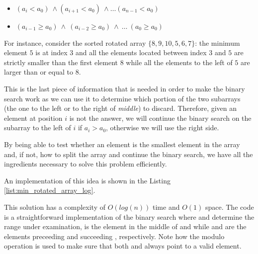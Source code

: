 \begin{itemize}
	\item $	(a_i < a_0) \: \wedge (a_{i+1} < a_0) \: \wedge \ldots (a_{n-1} < a_0) $
	\item $	(a_{i-1} \geq a_0) \: \wedge \: (a_{i-2} \geq a_0) \: \wedge \: \ldots \: (a_{0} \geq a_0) $
\end{itemize}
For instance, consider the sorted rotated array $\{8,9,10,5,6,7\}$: the minimum element $5$ is at index $3$ and all the elements located between index $3$ and $5$ are strictly smaller than the first element $8$ while all the elements to the left of $5$ are larger than or equal to $8$.

This is the last piece of information that is needed in order to make the binary search work as we can use it to determine which portion of the two subarrays (the one to the left or to the right of \textit{middle}) to discard. Therefore, given an element at position $i$ is not the answer, we will continue the binary search on the subarray to the left of $i$ if $a_i > a_0$, otherwise we will use the right side.

By being able to test whether an element is the smallest element in the array and,  if not, how to split the array and continue the binary search, we have all the ingredients necessary to solve this problem efficiently.

An implementation of this idea is shown in the Listing \ref{list:min_rotated_array_log}.



This solution has a complexity of $O(log(n))$ time and $O(1)$ space.
The code is a straightforward implementation of the binary search where  and  determine the range under examination,  is the element in the middle of  and  while  and  are the elements preceeding and succeeding , respectively. Note how the modulo operation is used to make sure that both  and  always point to a valid element. 